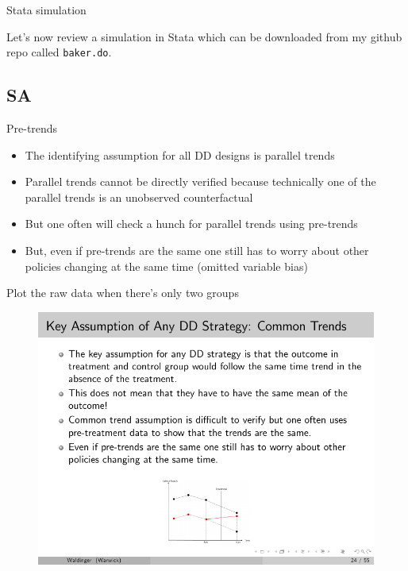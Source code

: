 \documentclass{beamer}
\begin{document}
\begin{frame}{Stata simulation}

Let's now review a simulation in Stata which can be downloaded from my github repo called \texttt{baker.do}.  

\bigskip

\end{frame}




\subsection{SA}


\begin{frame}{Pre-trends}

\begin{itemize}

	\item The identifying assumption for all DD designs is parallel trends
	\item Parallel trends cannot be directly verified because technically one of the parallel trends is an unobserved counterfactual
	\item But one often will check a hunch for parallel trends using pre-trends
	\item But, even if pre-trends are the same one still has to worry about other policies changing at the same time (omitted variable bias)

\end{itemize}

\end{frame}

\begin{frame}{Plot the raw data when there's only two groups}

	\begin{figure}
	\includegraphics[scale=2.5]{./lecture_includes/waldinger_dd_6.pdf}
	\end{figure}

\end{frame}
\end{document}
